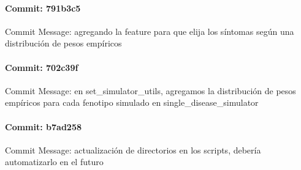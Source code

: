\documentclass{article}
\begin{document}
\paragraph{Commit: 791b3c5}
Commit Message: agregando la feature para que elija los síntomas según una distribución de pesos empíricos

\paragraph{Commit: 702c39f}
Commit Message: en set_simulator_utils, agregamos la distribución de pesos empíricos para cada fenotipo simulado en single_disease_simulator

\paragraph{Commit: b7ad258}
Commit Message: actualización de directorios en los scripts, debería automatizarlo en el futuro

\end{document}
